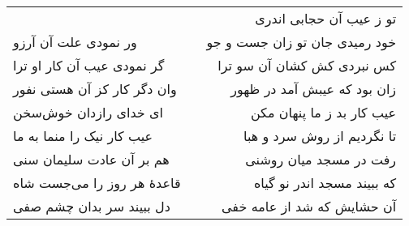 \begin{center}
\begin{longtable}{l p{0.5cm} r}
&&
تو ز عیب آن حجابی اندری
\\
ور نمودی علت آن آرزو
&&
خود رمیدی جان تو زان جست و جو
\\
گر نمودی عیب آن کار او ترا
&&
کس نبردی کش کشان آن سو ترا
\\
وان دگر کار کز آن هستی نفور
&&
زان بود که عیبش آمد در ظهور
\\
ای خدای رازدان خوش‌سخن
&&
عیب کار بد ز ما پنهان مکن
\\
عیب کار نیک را منما به ما
&&
تا نگردیم از روش سرد و هبا
\\
هم بر آن عادت سلیمان سنی
&&
رفت در مسجد میان روشنی
\\
قاعدهٔ هر روز را می‌جست شاه
&&
که ببیند مسجد اندر نو گیاه
\\
دل ببیند سر بدان چشم صفی
&&
آن حشایش که شد از عامه خفی
\\
\end{longtable}
\end{center}
